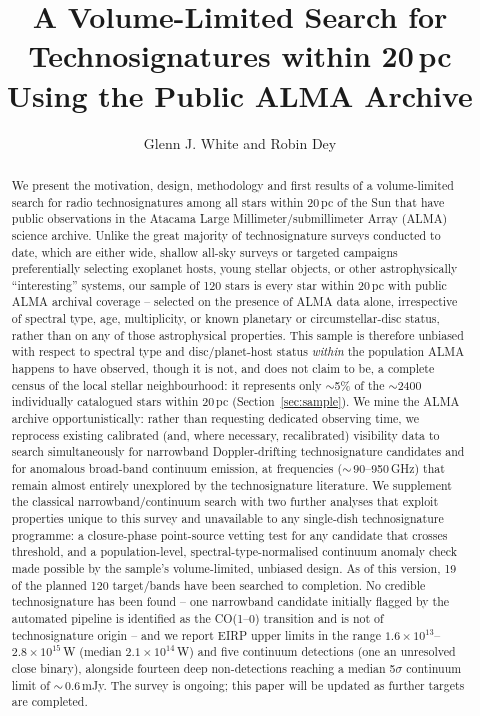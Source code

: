 \documentclass{openjournal}
\begin{document}
\title{A Volume-Limited Search for Technosignatures within 20\,pc Using the Public ALMA Archive}

\author{Glenn J. White and Robin Dey}

\begin{abstract}
We present the motivation, design, methodology and first results of a
volume-limited search for radio technosignatures among all stars within
20\,pc of the Sun that have public observations in the Atacama Large
Millimeter/submillimeter Array (ALMA) science archive. Unlike the great
majority of technosignature surveys conducted to date, which are either
wide, shallow all-sky surveys or targeted campaigns preferentially
selecting exoplanet hosts, young stellar objects, or other astrophysically
``interesting'' systems, our sample of 120 stars is every star within
20\,pc with public ALMA archival coverage -- selected on the presence of
ALMA data alone, irrespective of spectral type, age, multiplicity, or
known planetary or circumstellar-disc status, rather than on any of those
astrophysical properties. This sample is therefore unbiased with respect
to spectral type and disc/planet-host status \emph{within} the population
ALMA happens to have observed, though it is not, and does not claim to
be, a complete census of the local stellar neighbourhood: it represents
only $\sim$5\% of the $\sim$2400 individually catalogued stars within
20\,pc (Section~\ref{sec:sample}). We mine the ALMA archive
opportunistically: rather than requesting dedicated observing time, we
reprocess existing calibrated (and, where necessary, recalibrated)
visibility data to search simultaneously for narrowband Doppler-drifting
technosignature candidates and for anomalous broad-band continuum
emission, at frequencies ($\sim$\,90--950\,GHz) that remain almost
entirely unexplored by the technosignature literature. We supplement the
classical narrowband/continuum search with two further analyses that
exploit properties unique to this survey and unavailable to any
single-dish technosignature programme: a closure-phase point-source
vetting test for any candidate that crosses threshold, and a
population-level, spectral-type-normalised continuum anomaly check made
possible by the sample's volume-limited, unbiased design. As of this
version, 19 of the planned 120 target/bands have been searched to
completion. No credible technosignature has been found -- one narrowband
candidate initially flagged by the automated pipeline is identified as
the CO(1--0) transition and is not of technosignature origin -- and we
report EIRP upper limits in the range $1.6\times10^{13}$--$2.8\times10^{15}$\,W
(median $2.1\times10^{14}$\,W) and five continuum detections (one an
unresolved close binary), alongside fourteen deep non-detections
reaching a median 5$\sigma$ continuum limit of $\sim$\,0.6\,mJy. The
survey is ongoing; this paper will be updated as further targets are
completed.
\end{abstract}
\end{document}
